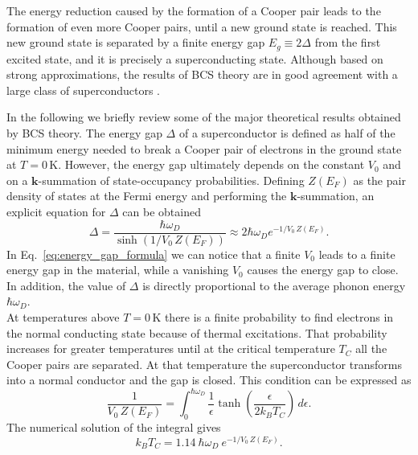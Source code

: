 \documentclass[../main/main.tex]{subfiles}
\begin{document}
The energy reduction caused by the formation of a Cooper pair leads to the formation of even more Cooper pairs, until a new ground state is reached. This new ground state is separated by a finite energy gap $E_g \equiv 2\Delta$ from the first excited state, and it is precisely a superconducting state. Although based on strong approximations, the results of BCS theory are in good agreement with a large class of superconductors \cite{meservey2018equilibrium}. \par
In the following we briefly review some of the major theoretical results obtained by BCS theory.
The energy gap $\Delta$ of a superconductor is defined as half of the minimum energy needed to break a Cooper pair of electrons in the ground state at $T=0\,$K. However, the energy gap ultimately depends on the constant $V_0$ and on a $\boldsymbol{k}$-summation of state-occupancy probabilities. Defining $Z(E_F)$ as the pair density of states at the Fermi energy and performing the $\boldsymbol{k}$-summation, an explicit equation for $\Delta$ can be obtained
\begin{equation} \label{eq:energy_gap_formula}
    \Delta = \frac{\hbar \omega_D}{\sinh{(1/V_0\, Z(E_F))}} \approx 2\hbar \omega_D e^{-1/V_0\, Z(E_F)} .
\end{equation}
In Eq.~\eqref{eq:energy_gap_formula} we can notice that a finite $V_0$ leads to a finite energy gap in the material, while a vanishing $V_0$ causes the energy gap to close. In addition, the value of $\Delta$ is directly proportional to the average phonon energy $\hbar \omega_D$.\\
At temperatures above $T=0\,$K there is a finite probability to find electrons in the normal conducting state because of thermal excitations. That probability increases for greater temperatures until at the critical temperature $T_C$ all the Cooper pairs are separated. At that temperature the superconductor transforms into a normal conductor and the gap is closed. This condition can be expressed as
\begin{equation} \label{eq:T_C_analytical}
    \frac{1}{V_0\, Z(E_F)} = \int_{0}^{\hbar \omega_D} \frac{1}{\epsilon}\tanh{\left( \frac{\epsilon}{2 k_B T_C} \right)} \,d\epsilon .
\end{equation}
The numerical solution of the integral gives
\begin{equation} \label{eq:T_C_numerical}
    k_B T_C = 1.14\ \hbar \omega_D\ e^{-1/V_0\, Z(E_F)}.
\end{equation}
\end{document}
